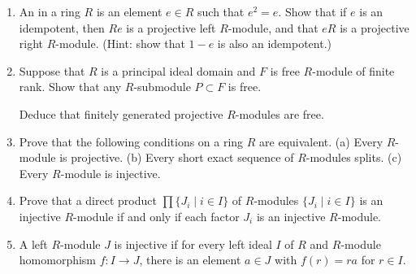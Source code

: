 \documentclass[12pt]{article}
\def\demph#1{{\color{blue}{\sl #1}}}
\begin{document}
\begin{enumerate}


\item  An \demph{idempotent $e$}  in a ring $R$ is an element $e\in R$ such that $e^2=e$.
  Show that if $e$ is an idempotent, then $Re$ is a projective left $R$-module, and that
  $eR$ is a projective right $R$-module.
  (Hint: show that $1{-}e$ is also an idempotent.)
 \vspace{-2pt}

\item    Suppose that $R$ is a principal ideal domain and $F$ is  free $R$-module of finite rank.
  Show that any $R$-submodule $P\subset F$ is free.

  Deduce that finitely generated projective $R$-modules are free.
 \vspace{-2pt} 


 \item Prove that the following conditions on a ring $R$ are equivalent.\newline
   (a) Every $R$-module is projective.\newline
   (b) Every short exact sequence of $R$-modules splits.\newline
   (c) Every $R$-module is injective.  
   \vspace{-2pt}

\item Prove that a direct product $\prod\{J_i\mid i\in I\}$ of $R$-modules $\{J_i\mid i\in I\}$ is an injective $R$-module if and only if
  each factor $J_i$ is an injective $R$-module.
   \vspace{-2pt}


 \item A left $R$-module $J$ is injective if for every left ideal $I$ of $R$ and $R$-module homomorphism
   $f\colon I\to J$, there is an element $a\in J$ with $f(r)=ra$ for $r\in I$.
   \vspace{-2pt}



\end{enumerate}
\end{document}

